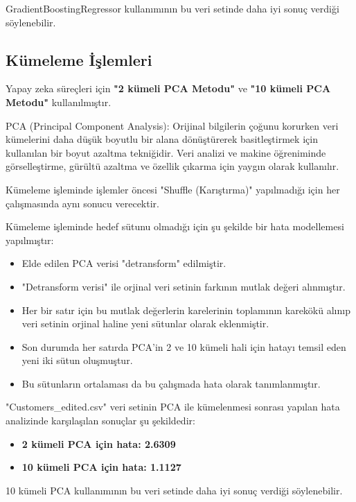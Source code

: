 GradientBoostingRegressor kullanımının bu veri setinde daha iyi sonuç verdiği söylenebilir.

\newpage
\subsection{Kümeleme İşlemleri}

Yapay zeka süreçleri için \textbf{"2 kümeli PCA Metodu"} ve \textbf{"10 kümeli PCA Metodu"} kullanılmıştır.

PCA (Principal Component Analysis): Orijinal bilgilerin çoğunu korurken veri kümelerini daha düşük boyutlu bir alana dönüştürerek basitleştirmek için kullanılan bir boyut azaltma tekniğidir. Veri analizi ve makine öğreniminde görselleştirme, gürültü azaltma ve özellik çıkarma için yaygın olarak kullanılır.

Kümeleme işleminde işlemler öncesi "Shuffle (Karıştırma)" yapılmadığı için her çalışmasında aynı sonucu verecektir.

Kümeleme işleminde hedef sütunu olmadığı için şu şekilde bir hata modellemesi yapılmıştır:
\begin{itemize}
\item Elde edilen PCA verisi "detransform" edilmiştir.
\item "Detransform verisi" ile orjinal veri setinin farkının mutlak değeri alınmıştır.
\item Her bir satır için bu mutlak değerlerin karelerinin toplamının karekökü alınıp veri setinin orjinal haline yeni sütunlar olarak eklenmiştir.
\item Son durumda her satırda PCA'in 2 ve 10 kümeli hali için hatayı temsil eden yeni iki sütun oluşmuştur.
\item Bu sütunların ortalaması da bu çalışmada hata olarak tanımlanmıştır.
\end{itemize}

"Customers\_edited.csv" veri setinin PCA ile kümelenmesi sonrası yapılan hata analizinde karşılaşılan sonuçlar şu şekildedir:
\begin{itemize}
\item \textbf{2 kümeli PCA için hata: 2.6309}
\item \textbf{10 kümeli PCA için hata: 1.1127}
\end{itemize}

10 kümeli PCA kullanımının bu veri setinde daha iyi sonuç verdiği söylenebilir.